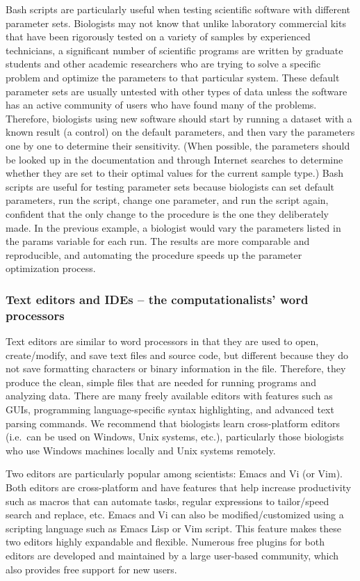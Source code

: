 \documentclass[ChapterTOCs,krantz2]{krantz} %
\begin{document}
Bash scripts are particularly useful when testing scientific software with
different parameter sets.  Biologists may not know that
unlike laboratory commercial kits that have been rigorously tested on a
variety of samples by experienced technicians, a significant
number of scientific programs are written by graduate students and other
academic researchers who are trying to solve a specific problem and optimize
the parameters to that particular system.  These default parameter sets are
usually untested with other types of data unless the software
has an active community of users who
have found many of the problems.  Therefore, biologists using new
software should start by running a dataset with a known result (a control) on
the default parameters, and then vary the parameters one by one to determine
their sensitivity.  (When possible, the parameters should be looked up in the
documentation and through Internet searches to determine whether they are set
to their optimal values for the current sample type.)  Bash scripts are useful
for testing parameter sets because biologists can set default parameters, run
the script, change one parameter, and run the script again, confident that the
only change to the procedure is the one they deliberately made.  In the
previous example, a biologist would vary the parameters listed in the params
variable for each run.  The results are more comparable and reproducible, and
automating the procedure speeds up the parameter optimization process.

\subsubsection{Text editors and IDEs -- the computationalists' word processors}

Text editors are 
similar to word processors in that they are used to open,
create/modify, and save text files and source code, but different because they
do not save formatting characters or binary information in the file.
Therefore, they produce the clean, simple files that are needed for running programs
and analyzing data.  There are many freely available editors with features such
as GUIs, programming language-specific syntax
highlighting, and advanced text parsing commands. 
We recommend that biologists learn cross-platform editors
(i.e.\ can be used on Windows, Unix systems, etc.), particularly
those biologists who use Windows machines locally and Unix systems
remotely.

Two editors are particularly popular among scientists: Emacs and Vi (or Vim).
Both editors are cross-platform and have features that help increase productivity
such as macros that can automate tasks, regular expressions to 
tailor/speed search and replace, etc.
Emacs and Vi can also be modified/customized using 
a scripting language such as Emacs Lisp or Vim script.
This feature makes these two editors highly expandable and flexible.
Numerous free plugins for both editors are developed and maintained by a
large user-based community, which also provides free support for new users.
\end{document}
